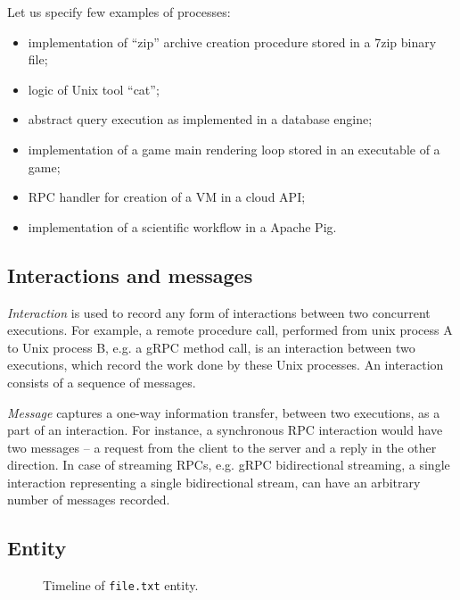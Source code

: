 Let us specify few examples of processes:
%
\begin{itemize}
	\item implementation of ``zip'' archive creation procedure stored in a 7zip binary file;
	\item logic of Unix tool ``cat'';
	\item abstract query execution as implemented in a database engine;
	\item implementation of a game main rendering loop stored in an executable of a game;
	\item RPC handler for creation of a VM in a cloud API;
	\item implementation of a scientific workflow in a Apache Pig.
\end{itemize}


\subsection{Interactions and messages}
\label{sec:model-interaction}\label{sec:model-message}

\textit{Interaction} is used to record any form of interactions between two concurrent executions. For example, a remote procedure call, performed from unix process A to Unix process B, e.g. a gRPC method call, is an interaction between two executions, which record the work done by these Unix processes. An interaction consists of a sequence of messages. 

\textit{Message} captures a one-way information transfer, between two executions, as a part of an interaction. For instance, a synchronous RPC interaction would have two messages -- a request from the client to the server and a reply in the other direction. In case of streaming RPCs, e.g. gRPC bidirectional streaming, a single interaction representing a single bidirectional stream, can have an arbitrary number of messages recorded.


\subsection{Entity}\label{sec:model-entity}

\begin{wrapfigure}[6]{h}{0.5\textwidth}
\caption{Timeline of \texttt{file.txt} entity.}
\label{fig:entity-timeline}
\end{wrapfigure}

